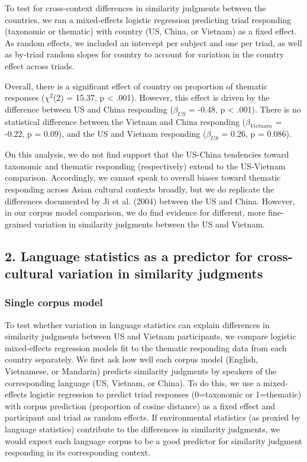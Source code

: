 \documentclass[10pt, letterpaper]{article}
\begin{document}
To test for cross-context differences in similarity judgments between
the countries, we ran a mixed-effects logistic regression predicting
triad responding (taxonomic or thematic) with country (US, China, or
Vietnam) as a fixed effect. As random effects, we included an intercept
per subject and one per triad, as well as by-triad random slopes for
country to account for variation in the country effect across triads.

Overall, there is a significant effect of country on proportion of
thematic responses (\(\chi^2\)(2) = 15.37, p \textless{} .001). However,
this effect is driven by the difference between US and China responding
(\(\beta_{US}\) = -0.48, p \textless{} .001). There is no statistical
difference between the Vietnam and China responding (\(\beta_{Vietnam}\)
= -0.22, p = 0.09), and the US and Vietnam responding (\(\beta_{US}\) =
0.26, p = 0.086).

On this analysis, we do not find support that the US-China tendencies
toward taxonomic and thematic responding (respectively) extend to the
US-Vietnam comparison. Accordingly, we cannot speak to overall biases
toward thematic responding across Asian cultural contexts broadly, but
we do replicate the differences documented by Ji et al. (2004) between
the US and China. However, in our corpus model comparison, we do find
evidence for different, more fine-grained variation in similarity
judgments between the US and Vietnam.

\hypertarget{language-statistics-as-a-predictor-for-cross-cultural-variation-in-similarity-judgments}{%
\subsection{2. Language statistics as a predictor for cross-cultural
variation in similarity
judgments}\label{language-statistics-as-a-predictor-for-cross-cultural-variation-in-similarity-judgments}}

\hypertarget{single-corpus-model}{%
\subsubsection{Single corpus model}\label{single-corpus-model}}

To test whether variation in language statistics can explain differences
in similarity judgments between US and Vietnam participants, we compare
logistic mixed-effects regression models fit to the thematic responding
data from each country separately. We first ask how well each corpus
model (English, Vietnamese, or Mandarin) predicts similarity judgments
by speakers of the corresponding language (US, Vietnam, or China). To do
this, we use a mixed-effects logistic regression to predict triad
responses (0=taxonomic or 1=thematic) with corpus prediction (proportion
of cosine distance) as a fixed effect and participant and triad as
random effects. If environmental statistics (as proxied by language
statistics) contribute to the differences in similarity judgments, we
would expect each language corpus to be a good predictor for similarity
judgment responding in its corresponding context.
\end{document}
